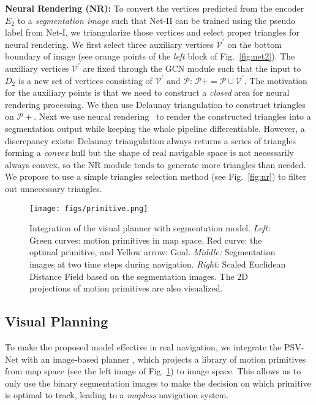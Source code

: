 \documentclass[letterpaper, 10 pt, journal, twoside]{ieeetran}
\begin{document}
\textbf{Neural Rendering (NR): }
To convert the vertices predicted from the encoder $E_2$ to a \textit{segmentation image} such that  Net-II can be trained using the pseudo label from  Net-I, we triangularize those vertices and select proper triangles for neural rendering. We first select three auxiliary vertices $\mathcal{V}^{'}$ on the bottom boundary of image (see orange points of the \textit{left} block of Fig.~\ref{fig:net2}). The auxiliary vertices $\mathcal{V}^{'}$ are fixed through the GCN module such that the input to $D_2$ is a new set of vertices consisting of $\mathcal{V}^{'}$ and $\mathcal{P}$: $\mathcal{P}+ = \mathcal{P}\cup \mathcal{V}^{'}$.
The motivation for the auxiliary points is that we need to construct a \textit{closed} area for neural rendering processing.
We then use Delaunay triangulation to construct triangles on $\mathcal{P}+$. Next we use neural rendering~\cite{kato2018neural} to render the constructed triangles into a segmentation output while keeping the whole pipeline differentiable. However, a discrepancy exists: Delaunay triangulation always returns a series of triangles forming a \textit{convex} hull but the shape of real navigable space is not necessarily always convex, so the NR module tends to generate more triangles than needed. We propose to use a simple triangles selection method (see Fig.~\ref{fig:nr}) to filter out unnecessary triangles.

\begin{figure} \vspace{7pt}
{
\centering
  {\texttt{[image: figs/primitive.png]}}
\caption{\small Integration of the visual planner \cite{chen2022cali} with segmentation model. \textit{Left:} Green curves: motion primitives in map space, Red curve: the optimal primitive, and Yellow arrow: Goal. \textit{Middle:} Segmentation images at two time steps during navigation. \textit{Right:} Scaled Euclidean Distance Field based on the segmentation images. The 2D projections of motion primitives are also visualized.
} 
\label{fig:primitive}  
}
\end{figure}

\subsection{Visual Planning}
To make the proposed model effective in real navigation, we integrate the PSV-Net with an image-based planner \cite{chen2022cali}, which projects a library of motion primitives from map space (see the left image of Fig. \ref{fig:primitive}) to image space. This allows us to only use the binary segmentation images to make the decision on which primitive is optimal to track, leading to a \textit{mapless} navigation system.
\end{document}
